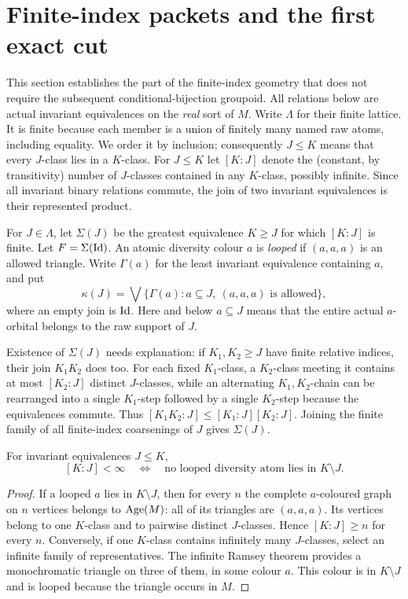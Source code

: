 \section{Finite-index packets and the first exact cut}\label{sec:packets}

This section establishes the part of the finite-index geometry that does
not require the subsequent conditional-bijection groupoid.  All
relations below are actual invariant equivalences on the \emph{real}
sort of $M$.  Write $\Lambda$ for their finite lattice.  It is finite
because each member is a union of finitely many named raw atoms,
including equality.  We order it by inclusion; consequently $J\le K$
means that every $J$-class lies in a $K$-class.  For $J\le K$ let
$[K:J]$ denote the (constant, by transitivity) number of $J$-classes
contained in any $K$-class, possibly infinite.  Since all invariant
binary relations commute, the join of two invariant equivalences is
their represented product.

\begin{definition}\label{def:packetcore}
For $J\in\Lambda$, let $\Sigma(J)$ be the greatest equivalence $K\ge J$
for which $[K:J]$ is finite.  Let $F=\Sigma(\mathrm{Id})$.  An atomic diversity
colour $a$ is \emph{looped} if $(a,a,a)$ is an allowed triangle.  Write
$\Gamma(a)$ for the least invariant equivalence containing $a$, and put
\[
\kappa(J)=\bigvee\{\Gamma(a): a\subseteq J,\ (a,a,a)
                  \text{ is allowed}\},
\]
where an empty join is $\mathrm{Id}$.  Here and below $a\subseteq J$ means
that the entire actual $a$-orbital belongs to the raw support of $J$.
\end{definition}

Existence of $\Sigma(J)$ needs explanation: if $K_1,K_2\ge J$
have finite relative indices, their join $K_1K_2$ does too.  For each
fixed $K_1$-class, a $K_2$-class meeting it contains at most
$[K_2:J]$ distinct $J$-classes, while an alternating $K_1,K_2$-chain
can be rearranged into a single $K_1$-step followed by a single
$K_2$-step because the equivalences commute.  Thus
$[K_1K_2:J]\le[K_1:J][K_2:J]$.  Joining the finite family of all
finite-index coarsenings of $J$ gives $\Sigma(J)$.

\begin{lemma}\label{lem:loopcrit}
For invariant equivalences $J\le K$,
\[
 [K:J]<\infty\quad\Longleftrightarrow\quad
 \text{no looped diversity atom lies in }K\setminus J.
\]
\end{lemma}
\begin{proof}
If a looped $a$ lies in $K\setminus J$, then for every $n$ the
complete $a$-coloured graph on $n$ vertices belongs to $\operatorname{Age}(M)$:
all of its triangles are $(a,a,a)$.  Its vertices belong to one
$K$-class and to pairwise distinct $J$-classes.  Hence $[K:J]\ge n$
for every $n$.  Conversely, if one $K$-class contains infinitely
many $J$-classes, select an infinite family of representatives.
The infinite Ramsey theorem provides a monochromatic triangle on
three of them, in some colour $a$.  This colour is in $K\setminus J$
and is looped because the triangle occurs in $M$.
\end{proof}

